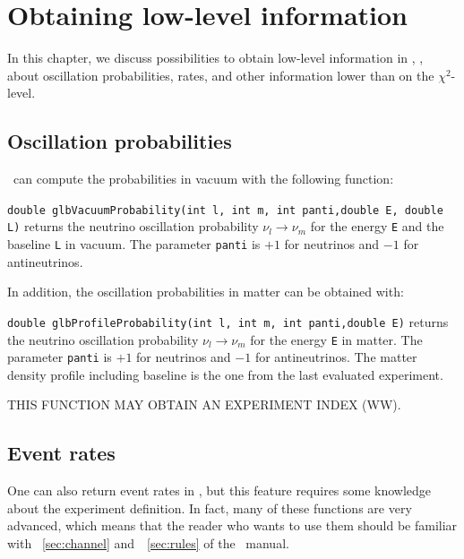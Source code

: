 \chapter{Obtaining low-level information}

In this chapter, we discuss possibilities to obtain low-level information
in \GLOBES , \ie, about oscillation probabilities, rates, and other
information lower than on the $\chi^2$-level.

\section{Oscillation probabilities}

\GLOBES\ can compute the probabilities in vacuum
with the following function:
\begin{function}
{\tt double glbVacuumProbability(int l, int m, int panti,double E, double L)} returns the neutrino oscillation probability $\nu_l \rightarrow \nu_m$ for the energy {\tt E} and the baseline {\tt L} in vacuum. The parameter
{\tt panti} is $+1$ for neutrinos and $-1$ for antineutrinos. 
\end{function}
In addition, the oscillation probabilities in matter can be obtained
with:
\begin{function}
{\tt double glbProfileProbability(int l, int m, int panti,double E)}
 returns the neutrino oscillation probability $\nu_l \rightarrow \nu_m$ for the energy {\tt E} in matter. The parameter
{\tt panti} is $+1$ for neutrinos and $-1$ for antineutrinos.
The matter density profile including baseline is the one from the last
evaluated experiment. 
\end{function}
THIS FUNCTION MAY OBTAIN AN EXPERIMENT INDEX (WW).
\section{Event rates}
One can also return event rates in \GLOBES , but this feature
requires some knowledge about the experiment definition. 
In fact, many of these functions are very advanced, which means
that the reader who wants to use them should be familiar with
\Secs~\ref{sec:channel} and~\Sec~\ref{sec:rules} of the \AEDL\ manual.

